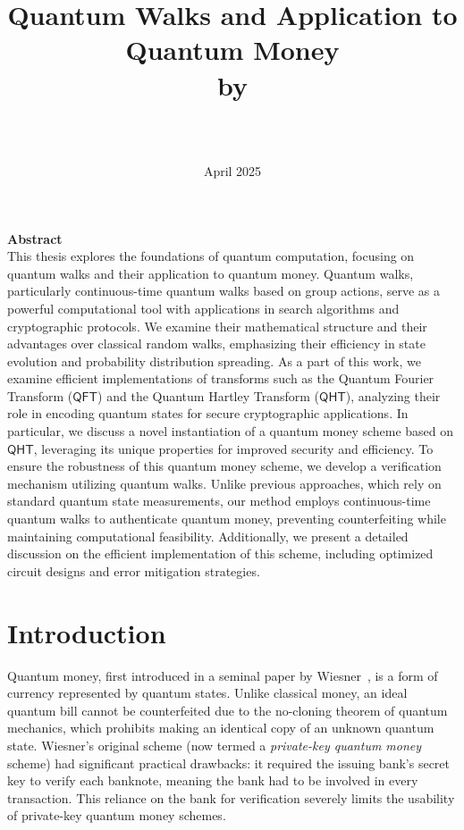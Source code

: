 \documentclass[12pt]{report}
\title{
  \textbf{Quantum Walks and Application to Quantum Money}\\[2em]
  \normalsize by\\[2em]
  \text{\large Ali Mousavi} \\[5em]
  \text{\shortstack{A Master's Thesis \\[0.5em]
   Submitted to the Department of Computing and Software\\[0.5em]
   McMaster University\\[0.5em]
   In Fulfillment of the Requirements\\[0.5em]
   For a Master's Degree}
  }

}
\date{April 2025}
\newcommand{\qht}{\mathsf{QHT}}
\newcommand{\qft}{\mathsf{QFT}}
\begin{document}
\maketitle
\tableofcontents


\newpage
\textbf{\large Abstract}\\


This thesis explores the foundations of quantum computation, focusing on quantum walks and their application to quantum money. Quantum walks, particularly continuous-time quantum walks based on group actions, serve as a powerful computational tool with applications in search algorithms and cryptographic protocols. We examine their mathematical structure and their advantages over classical random walks, emphasizing their efficiency in state evolution and probability distribution spreading. As a part of this work, we examine efficient implementations of transforms such as the Quantum Fourier Transform ($\qft$) and the Quantum Hartley Transform ($\qht$), analyzing their role in encoding quantum states for secure cryptographic applications. In particular, we discuss a novel instantiation of a quantum money scheme based on $\qht$, leveraging its unique properties for improved security and efficiency.
To ensure the robustness of this quantum money scheme, we develop a verification mechanism utilizing quantum walks. Unlike previous approaches, which rely on standard quantum state measurements, our method employs continuous-time quantum walks to authenticate quantum money, preventing counterfeiting while maintaining computational feasibility. Additionally, we present a detailed discussion on the efficient implementation of this scheme, including optimized circuit designs and error mitigation strategies.








\chapter{Introduction}
Quantum money, first introduced in a seminal paper by Wiesner~\cite{Wiesner1983}, is a form of currency represented by quantum states. Unlike classical money, an ideal quantum bill cannot be counterfeited due to the no-cloning theorem of quantum mechanics, which prohibits making an identical copy of an unknown quantum state. Wiesner’s original scheme (now termed a \emph{private-key quantum money} scheme) had significant practical drawbacks: it required the issuing bank’s secret key to verify each banknote, meaning the bank had to be involved in every transaction. This reliance on the bank for verification severely limits the usability of private-key quantum money schemes.
\end{document}
